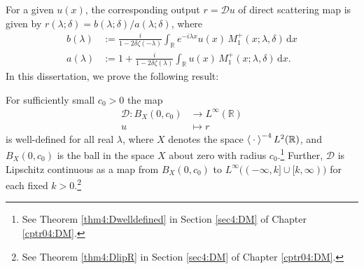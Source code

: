 \documentclass[../dissertation.tex]{subfiles}
\begin{document}
For a given 
$u(x)$, the corresponding output $r = \mathscr D u$ of direct scattering map is
given by 
$r(\lambda; \delta) = b(\lambda;\delta) / a(\lambda; \delta)$,\label{sym0:reflection} 
where
\begin{align*}
	b(\lambda)
		&:= 
			\frac{i}{1-2\delta\zeta(-\lambda)} 
			\int_{\mathbb R} e^{-i\lambda x} 
				u(x) \, M_1^+(x; \lambda,\delta) 
			\, \mathrm{d}x
			\\
	a(\lambda)
		&:=
			1 
			+ \frac{i}{1-2\delta \zeta(\lambda)}
				\int_{\mathbb R} 
					u(x) \, M_1^+(x; \lambda,\delta) 
				\, \mathrm{d}x.
\end{align*}
In this dissertation, we prove the following result:
\begin{thm}\label{thm0:MainResult}
	For sufficiently small $c_0 > 0$ the map
	\begin{align*}
		\mathscr D : B_X(0, c_0) &\to L^\infty(\mathbb R) \\
		                       u &\mapsto r
	\end{align*}
	is well-defined for all real $\lambda$, where 
	$X$ denotes the space $\left\langle \kern 0.5ex \cdot \kern 0.5ex \right\rangle^{-4} L^2(\mathbb R)$, and 
	$B_X(0, c_0)$ \label{sym:ball} 
	is the ball in the 
	space $X$ about zero with radius $c_0$.\footnote{See Theorem \ref{thm4:Dwelldefined}
	in Section \ref{sec4:DM} of Chapter \ref{cptr04:DM}.}
	Further, $\mathscr D$\label{sym0:DSM} is 
	Lipschitz continuous as a map from $B_X(0, c_0)$ to 
	$L^\infty\big((-\infty, k]\cup[k, \infty)\big)$ for each fixed 
	$k>0$.\footnote{See Theorem \ref{thm4:DlipR} in Section \ref{sec4:DM} of Chapter 
	\ref{cptr04:DM}.}
\end{thm}
\end{document}
